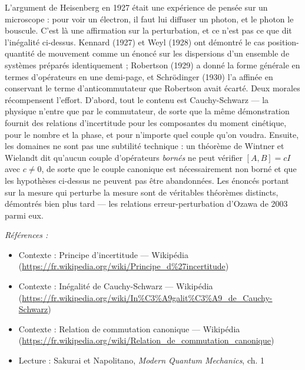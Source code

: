 \documentclass[11pt]{article}
\newenvironment{refs}{\par\small\noindent\emph{Références :}\begin{itemize}\setlength\itemsep{0pt}}{\end{itemize}\normalsize}
\begin{document}
\noindent L'argument de Heisenberg en 1927 était une expérience de pensée sur un
microscope : pour voir un électron, il faut lui diffuser un photon, et le photon le bouscule.
C'est là une affirmation sur la perturbation, et ce n'est pas ce que dit l'inégalité ci-dessus.
Kennard (1927) et Weyl (1928) ont démontré le cas position-quantité de mouvement comme un énoncé
sur les dispersions d'un ensemble de systèmes préparés identiquement ; Robertson (1929) a donné la
forme générale en termes d'opérateurs en une demi-page, et Schrödinger (1930) l'a affinée en
conservant le terme d'anticommutateur que Robertson avait écarté. Deux morales récompensent
l'effort. D'abord, tout le contenu est Cauchy-Schwarz --- la physique n'entre que par le
commutateur, de sorte que la même démonstration fournit des relations d'incertitude pour les
composantes du moment cinétique, pour le nombre et la phase, et pour n'importe quel couple qu'on
voudra. Ensuite, les domaines ne sont pas une subtilité technique : un théorème de Wintner et
Wielandt dit qu'aucun couple d'opérateurs \textit{bornés} ne peut vérifier $[A,B]=cI$ avec
$c\neq 0$, de sorte que le couple canonique est nécessairement non borné et que les hypothèses
ci-dessus ne peuvent pas être abandonnées. Les énoncés portant sur la mesure qui perturbe la
mesure sont de véritables théorèmes distincts, démontrés bien plus tard --- les relations
erreur-perturbation d'Ozawa de 2003 parmi eux.

\begin{refs}
\item Contexte : Principe d'incertitude --- Wikipédia (\url{https://fr.wikipedia.org/wiki/Principe_d%27incertitude})
\item Contexte : Inégalité de Cauchy-Schwarz --- Wikipédia (\url{https://fr.wikipedia.org/wiki/In%C3%A9galit%C3%A9_de_Cauchy-Schwarz})
\item Contexte : Relation de commutation canonique --- Wikipédia (\url{https://fr.wikipedia.org/wiki/Relation_de_commutation_canonique})
\item Lecture : Sakurai et Napolitano, \textit{Modern Quantum Mechanics}, ch. 1
\end{refs}

\bigskip
\end{document}
